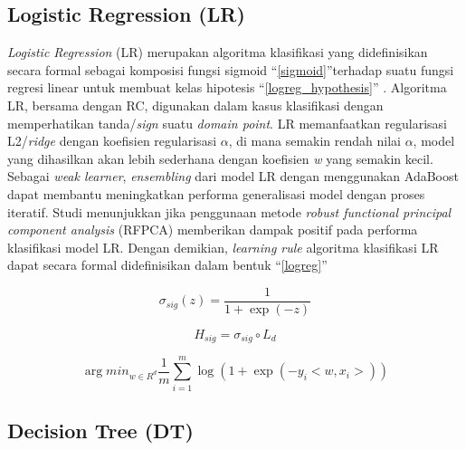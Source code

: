 \documentclass[conference]{IEEEtran}
\begin{document}
\subsection{Logistic Regression (LR)}

\textit{Logistic Regression} (LR) merupakan algoritma klasifikasi yang didefinisikan secara formal sebagai komposisi fungsi 
sigmoid ``\eqref{sigmoid}''terhadap suatu fungsi regresi linear untuk membuat kelas hipotesis ``\eqref{logreg_hypothesis}'' \cite{b4}. Algoritma LR, bersama dengan RC, digunakan dalam kasus klasifikasi 
dengan memperhatikan tanda/\textit{sign} suatu \textit{domain point}\cite{b9}. LR memanfaatkan regularisasi L2/\textit{ridge} dengan koefisien regularisasi 
$\alpha$, di mana semakin rendah nilai $\alpha$, model yang dihasilkan akan lebih sederhana dengan koefisien \textit{w} yang semakin kecil. 
Sebagai \textit{weak learner}, \textit{ensembling} dari model LR dengan menggunakan AdaBoost dapat membantu meningkatkan performa generalisasi model 
dengan proses iteratif.  Studi \cite{b14} menunjukkan jika penggunaan metode \textit{robust functional principal component analysis} (RFPCA) 
memberikan dampak positif pada performa klasifikasi model LR. Dengan demikian, \textit{learning rule} algoritma klasifikasi LR dapat secara formal didefinisikan dalam bentuk ``\eqref{logreg}''

\begin{equation}
    \sigma_{sig}(z) = \frac{1}{1+ \exp(-z)} \label{sigmoid}
\end{equation}

\begin{equation}
    H_{sig} = \sigma_{sig} \circ L_d \label{logreg_hypothesis}
\end{equation}

\begin{equation}
    \arg min_{w \in R^d} \frac{1}{m} \sum_{i=1}^{m}\log(1+\exp(-y_i<w, x_i>)) \label{logreg}
\end{equation}

\subsection{Decision Tree (DT)}
\end{document}

